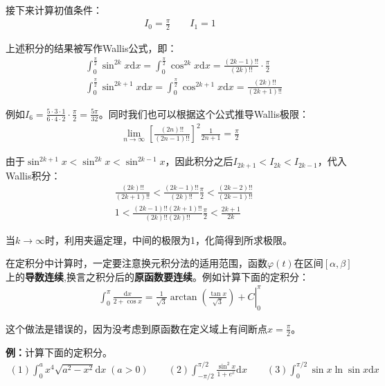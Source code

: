 \documentclass{ctexart}
\let\oldtextbf\textbf %
\renewcommand{\textbf}[1]{\textcolor{btex}{\oldtextbf{#1}}} %
\begin{document}
接下来计算初值条件：
\begin{align*}
    I_0=\frac{\pi}{2}\qquad I_1=1
\end{align*}
\begin{tcolorbox}[
    colback=bac1,     %
    colframe=fra1,   %
    coltitle=white,             %
    coltext=tex1,
    title=Wallis公式与Wallis极限,
    fonttitle=\bfseries,        %
arc=3mm,                     %
breakable
]
上述积分的结果被写作Wallis公式，即：
\begin{align*}
    &\int_0^\frac{\pi}{2}\sin^{2k}x\mathrm{d}x=\int_0^\frac{\pi}{2}\cos^{2k} x\mathrm{d}x
=\frac{(2k-1)!!}{(2k)!!}\cdot\frac{\pi}{2}\\
&\int_0^\frac{\pi}{2}\sin^{2k+1}x\mathrm{d}x=\int_0^\frac{\pi}{2}\cos^{2k+1} x\mathrm{d}x
=\frac{(2k)!!}{(2k+1)!!}\tag{5-10}
\end{align*}

例如$I_6=\frac{5\cdot 3\cdot 1}{6\cdot 4\cdot 2}\cdot\frac{\pi}{2}=\frac{5\pi}{32}$。同时我们也可以根据这个公式推导Wallis极限：
\begin{align*}
    \lim_{n\to\infty}\left[\frac{(2n)!!}{(2n-1)!!}\right]^2\frac{1}{2n+1}=\frac{\pi}{2}\tag{5-11}
\end{align*}

由于$\sin^{2k+1}x<\sin^{2k}x<\sin^{2k-1}x$，因此积分之后$I_{2k+1}<I_{2k}<I_{2k-1}$，代入Wallis积分：
\begin{align*}
   &\frac{(2k)!!}{(2k+1)!!}<\frac{(2k-1)!!}{(2k)!!}\frac{\pi}{2}<\frac{(2k-2)!!}{(2k-1)!!}\\
&1<\frac{(2k-1)!!(2k+1)!!}{(2k)!!(2k)!!}\frac{\pi}{2}<\frac{2k+1}{2k}  
\end{align*}

当$k\to\infty$时，利用夹逼定理，中间的极限为1，化简得到所求极限。
\end{tcolorbox}

在定积分中计算时，一定要注意换元积分法的适用范围，函数$\varphi(t)$在区间$[\alpha,\beta]$上的\textbf{导数连续},换言之积分后的\textbf{原函数要连续}。例如计算下面的定积分：
\begin{align*}
    \int_0^\pi\frac{\mathrm{d}x}{2+\cos x}=\left.\frac{1}{\sqrt{3}}\arctan(\frac{\tan x}{\sqrt{3}})+C\right|_0^\pi
\end{align*}

这个做法是错误的，因为没考虑到原函数在定义域上有间断点$x=\frac{\pi}{2}$。

\textbf{例：}计算下面的定积分。
\begin{align*}
    (1)\int_0^a x^4\sqrt{a^2-x^2}\mathrm{d}x\;(a>0)\qquad (2)\int_{-\pi/2}^{\pi/2}\frac{\sin ^2x}{1+e^x}\mathrm{d}x\qquad  (3)\int_0^{\pi/2}\sin x\ln\sin x\mathrm{d}x
\end{align*}
\end{document}
